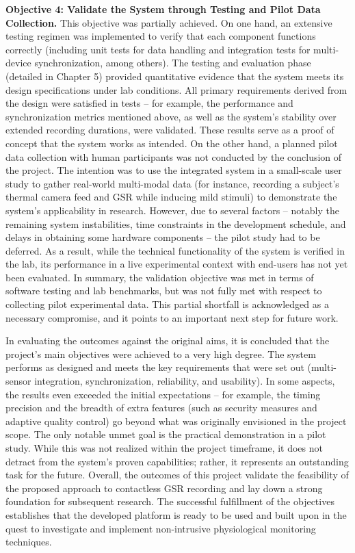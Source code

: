 \textbf{Objective 4: Validate the System through Testing and Pilot Data Collection.} This objective was partially achieved. On one hand, an extensive testing regimen was implemented to verify that each component functions correctly (including unit tests for data handling and integration tests for multi-device synchronization, among others). The testing and evaluation phase (detailed in Chapter 5) provided quantitative evidence that the system meets its design specifications under lab conditions. All primary requirements derived from the design were satisfied in tests -- for example, the performance and synchronization metrics mentioned above, as well as the system's stability over extended recording durations, were validated. These results serve as a proof of concept that the system works as intended. On the other hand, a planned pilot data collection with human participants was not conducted by the conclusion of the project. The intention was to use the integrated system in a small-scale user study to gather real-world multi-modal data (for instance, recording a subject's thermal camera feed and GSR while inducing mild stimuli) to demonstrate the system's applicability in research. However, due to several factors -- notably the remaining system instabilities, time constraints in the development schedule, and delays in obtaining some hardware components -- the pilot study had to be deferred. As a result, while the technical functionality of the system is verified in the lab, its performance in a live experimental context with end-users has not yet been evaluated. In summary, the validation objective was met in terms of software testing and lab benchmarks, but was not fully met with respect to collecting pilot experimental data. This partial shortfall is acknowledged as a necessary compromise, and it points to an important next step for future work.

In evaluating the outcomes against the original aims, it is concluded that the project's main objectives were achieved to a very high degree. The system performs as designed and meets the key requirements that were set out (multi-sensor integration, synchronization, reliability, and usability). In some aspects, the results even exceeded the initial expectations -- for example, the timing precision and the breadth of extra features (such as security measures and adaptive quality control) go beyond what was originally envisioned in the project scope. The only notable unmet goal is the practical demonstration in a pilot study. While this was not realized within the project timeframe, it does not detract from the system's proven capabilities; rather, it represents an outstanding task for the future. Overall, the outcomes of this project validate the feasibility of the proposed approach to contactless GSR recording and lay down a strong foundation for subsequent research. The successful fulfillment of the objectives establishes that the developed platform is ready to be used and built upon in the quest to investigate and implement non-intrusive physiological monitoring techniques.

